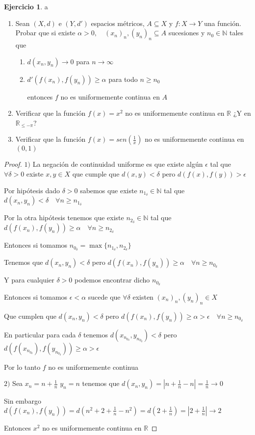 \documentclass[12pt]{article}
\newcommand{\R}{\mathbb{R}}
\newcommand{\N}{\mathbb{N}}
\newcommand{\ra}{\rightarrow}
\theoremstyle{definition}
\newtheorem{ej}{Ejercicio}
\begin{document}
 \begin{ej}a
   \begin{enumerate}
     \item Sean $(X,d)$ e $(Y,d')$ espacios métricos, $A \subseteq X$ y $f: X \ra Y$ una función. Probar que si existe $\alpha > 0, \quad (x_n)_n, (y_n)_n \subseteq A$ sucesiones y $n_0 \in \N$ tales que 
       \begin{enumerate}
	 \item $d(x_n,y_n) \ra 0$ para $n \ra \infty$
	 \item $d'(f(x_n),f(y_n)) \geq \alpha$ para todo $n \geq n_0$

	   entonces $f$ no es uniformemente continua en $A$
       \end{enumerate}
     \item Verificar que la función $f(x) = x^2$ no es uniformemente continua en $\R$ ¿Y en $\R_{\leq -\pi}$?
     \item Verificar que la función $f(x) = sen(\frac{1}{x})$ no es uniformemente continua en $(0,1)$
   \end{enumerate}
   \begin{proof}
   $1)$ La negación de continuidad uniforme es que existe algún $\epsilon$ tal que $\forall \delta > 0 $ existe $x,y \in X$ que cumple que $d(x,y) < \delta$ pero $d(f(x),f(y)) > \epsilon$

   Por hipótesis dado $\delta > 0 $ sabemos que existe $n_{1_{\delta}} \in \N$ tal que $d(x_n,y_n) < \delta \quad \forall n \geq n_{1_{\delta}}$

   Por la otra hipótesis tenemos que existe $n_{2_{\delta}} \in \N$ tal que $d(f(x_n),f(y_n)) \geq \alpha \quad \forall n \geq n_{2_{\delta}}$

   Entonces si tomamos $n_{0_{\delta}} = \max \{n_{1_{\delta}},n_{2_{\delta}}\}$

   Tenemos que $d(x_n,y_n) < \delta$ pero $d(f(x_n),f(y_n)) \geq \alpha \quad \forall n \geq n_{0_{\delta}}$ 

   Y para cualquier $\delta > 0 $ podemos encontrar dicho $n_{0_{\delta}}$

   Entonces si tomamos $\epsilon < \alpha$ sucede que $\forall \delta $ existen $(x_n)_n,(y_n)_n \in X$

   Que cumplen que $d(x_n,y_n) < \delta$ pero $d(f(x_n),f(y_n)) \geq \alpha > \epsilon \quad \forall n \geq n_{0_{\delta}}$

   En particular para cada $\delta$ tenemos $d(x_{n_{0_{\delta}}},y_{n_{0_{\delta}}}) < \delta$ pero  $d(f(x_{n_{0_{\delta}}}),f(y_{n_{0_{\delta}}})) \geq \alpha > \epsilon$  

   Por lo tanto $f$ no es uniformemente continua

 \noindent $2)$ Sea $x_n = n +  \frac{1}{n}$ $y_n = n$ tenemos que $d(x_n,y_n) = |n + \frac{1}{n} - n| = \frac{1}{n} \ra 0$

 Sin embargo $d(f(x_n),f(y_n)) = d(n^2 + 2 +\frac{1}{n} - n^2) = d(2 + \frac{1}{n}) = |2 + \frac{1}{n}| \ra 2$

 Entonces $x^2$ no es uniformemente continua en $\R$
   \end{proof}
 \end{ej}
 
\end{document}
